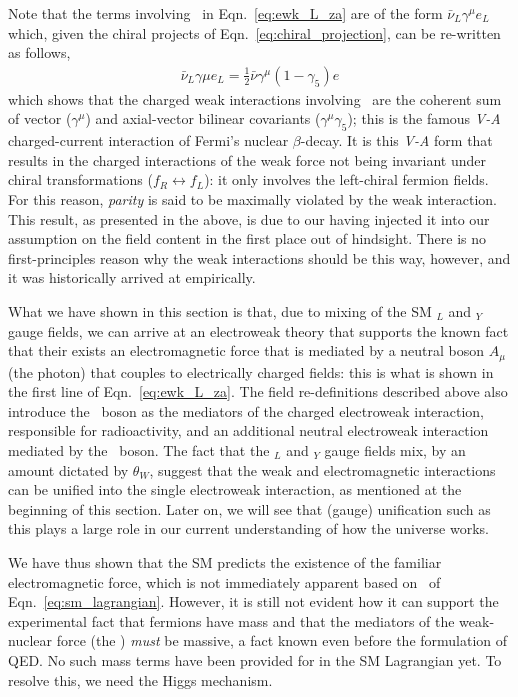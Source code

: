 Note that the terms involving \fieldWpm~in Eqn.~\ref{eq:ewk_L_za} are of the form $\bar{\nu}_L \gamma^{\mu} e_L$ which, given the chiral projects of Eqn.~\ref{eq:chiral_projection}, can be
re-written as follows,
\begin{align}
	\bar{\nu}_L \gamma{\mu} e_L = \frac{1}{2} \bar{\nu} \gamma^{\mu}(1-\gamma_5) e
	\label{eq:v_minus_a}
\end{align}
which shows that the charged weak interactions involving \fieldWpm~are the coherent
sum of vector ($\gamma^{\mu}$) and axial-vector bilinear covariants ($\gamma^{\mu}\gamma_5$); this is the famous \textit{V-A} charged-current interaction of Fermi's nuclear $\beta$-decay.
It is this \textit{V-A} form that results in the charged interactions of the weak force
not being invariant under chiral transformations ($f_R \leftrightarrow f_L$): it only involves
the left-chiral fermion fields. For this reason, \textit{parity}
is said to be maximally violated by the weak interaction.
This result, as presented in the above, is due to our having injected
it into our assumption on the field content in the first place out of hindsight. There
is no first-principles reason why the weak interactions should be this way, however,
and it was historically arrived at empirically.

What we have shown in this section is that, due to mixing of the SM \SUtwo$_L$
and \Uone$_Y$ gauge fields, we can arrive at an electroweak theory that supports
the known fact that their exists an electromagnetic force that is mediated
by a neutral boson $A_{\mu}$ (the photon) that couples to electrically charged fields: this is what
is shown in the first line of Eqn.~\ref{eq:ewk_L_za}. The field re-definitions described above
also introduce the \fieldWpm~boson as the mediators of the charged electroweak interaction,
responsible for radioactivity, and an additional neutral electroweak interaction mediated
by the \fieldZ~boson.
The fact that the \SUtwo$_L$ and \Uone$_Y$ gauge fields mix, by an amount dictated by $\theta_W$,
suggest that the weak and electromagnetic interactions can be unified into the single
electroweak interaction, as mentioned at the beginning of this section. Later on, we will see
that (gauge) unification such as this plays a large role in our current understanding
of how the universe works.

We have thus shown that the SM predicts the existence of the familiar electromagnetic force,
which is not immediately apparent based on \SML~of Eqn.~\ref{eq:sm_lagrangian}. 
However, it is still not evident how it can
support the experimental fact that fermions have mass and that the mediators of the
weak-nuclear force (the \fieldWpm) \textit{must} be massive, a fact known
even before the formulation of QED. No such mass terms
have been provided for in the SM Lagrangian yet. To resolve this, we
need the Higgs mechanism.
